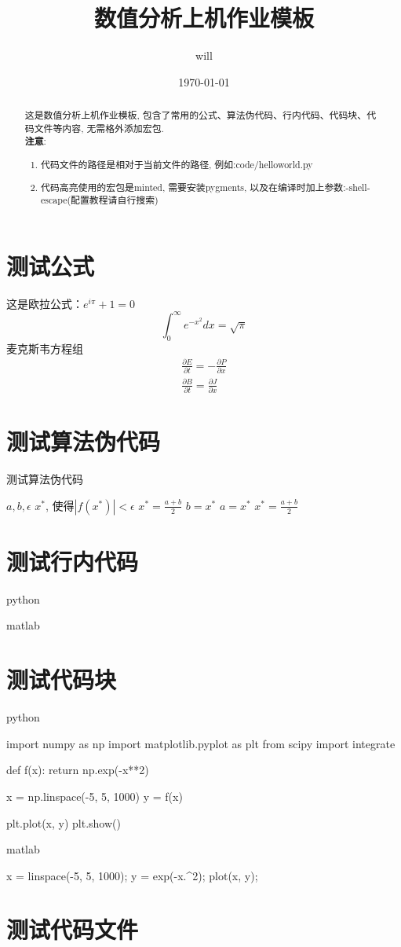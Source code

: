 \documentclass[11pt,a4paper]{TGNA}
\title{\textbf{数值分析上机作业模板}}
\author{will}
\date{\today}
\begin{document}
\maketitle
\begin{abstract}
    这是数值分析上机作业模板, 包含了常用的公式、算法伪代码、行内代码、代码块、代码文件等内容, 无需格外添加宏包.\\
    \textbf{注意}:
    \begin{enumerate}
        \item 代码文件的路径是相对于当前文件的路径, 例如:code/helloworld.py
        \item 代码高亮使用的宏包是minted, 需要安装pygments, 以及在编译时加上参数:-shell-escape(配置教程请自行搜索)
    \end{enumerate}
\end{abstract}
\section{测试公式}
这是欧拉公式：$e^{i\pi}+1=0$
$$
\int_{0}^{\infty} e^{-x^2} dx = \sqrt{\pi}
$$
麦克斯韦方程组
$$
\begin{aligned}
    \frac{\partial E}{\partial t} = -\frac{\partial P}{\partial x} \\
\frac{\partial B}{\partial t} = \frac{\partial J}{\partial x}
\end{aligned}
$$

\section{测试算法伪代码}
\begin{algorithm}
\caption{测试算法伪代码}
\begin{algorithmic}
\REQUIRE $a, b, \epsilon$
\ENSURE $x^*$, 使得$|f(x^*)| < \epsilon$
\STATE $x^* = \frac{a + b}{2}$
\STATE $b = x^*$
\ELSE
\STATE $a = x^*$
\ENDIF
\STATE $x^* = \frac{a + b}{2}$
\ENDWHILE
\end{algorithmic}
\end{algorithm}
\section{测试行内代码}
python\\

matlab\\

\section{测试代码块}
python
\begin{pythoncode}
import numpy as np
import matplotlib.pyplot as plt
from scipy import integrate

def f(x):
    return np.exp(-x**2)

x = np.linspace(-5, 5, 1000)
y = f(x)

plt.plot(x, y)
plt.show()
\end{pythoncode}

matlab
\begin{matlabcode}
x = linspace(-5, 5, 1000);
y = exp(-x.^2);
plot(x, y);
\end{matlabcode}

\section{测试代码文件}

\end{document}

